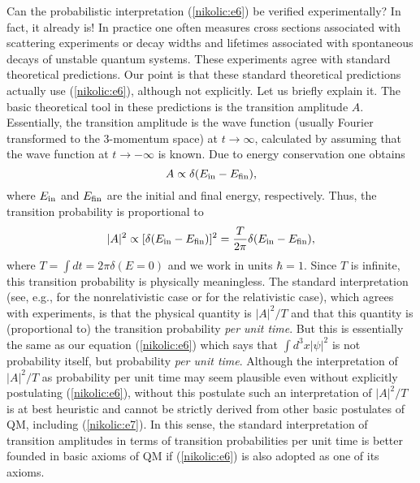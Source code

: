 \documentclass[12pt,twoside]{report} %
\begin{document}
Can the probabilistic interpretation (\ref{nikolic:e6}) be verified experimentally?
In fact, it already is! In practice one often measures cross sections 
associated with scattering experiments or decay widths and lifetimes
associated with spontaneous decays of unstable quantum systems. 
These experiments agree with standard theoretical predictions. Our point is
that these standard theoretical predictions actually use (\ref{nikolic:e6}),
although not explicitly. Let us briefly explain it. 
The basic theoretical tool
in these predictions is the transition amplitude $A$. Essentially,
the transition amplitude is the wave function (usually Fourier transformed
to the 3-momentum space) at $t\rightarrow\infty$, calculated by 
assuming that the wave function at $t\rightarrow -\infty$ is known.
Due to energy conservation one obtains 
\begin{equation}
 A\propto\delta(E_{\rm in}-E_{\rm fin}) ,
\end{equation}
where $E_{\rm in}$ and $E_{\rm fin}$ are the initial and final energy, respectively.
Thus, the transition probability is proportional to
\begin{equation}
|A|^2\propto[\delta(E_{\rm in}-E_{\rm fin})]^2=\frac{T}{2\pi}\delta(E_{\rm in}-E_{\rm fin}),
\end{equation}
where $T=\int dt =2\pi \delta(E=0)$ and we work in units $\hbar=1$. 
Since $T$ is infinite, this transition
probability is physically meaningless. The standard interpretation 
(see, e.g., \cite{schiff} for the nonrelativistic case or \cite{halz,bd1} for the
relativistic case), which agrees with experiments, 
is that the physical quantity is $|A|^2/T$ and that this quantity is (proportional to)
the transition probability {\em per unit time}. But this is essentially the same
as our equation (\ref{nikolic:e6}) which says that $\int d^3x |\psi|^2$ is not 
probability itself, but probability {\em per unit time}. Although 
the interpretation of $|A|^2/T$ as probability per unit time 
may seem plausible even without explicitly postulating (\ref{nikolic:e6}),
without this postulate such an interpretation of $|A|^2/T$
is at best heuristic and cannot be strictly derived from other basic
postulates of QM, including (\ref{nikolic:e7}).
In this sense, the standard interpretation of transition amplitudes
in terms of transition probabilities per unit time
is better founded in basic axioms of QM if (\ref{nikolic:e6}) is also adopted
as one of its axioms.
\end{document}
